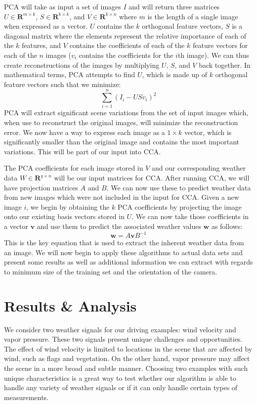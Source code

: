 PCA will take as input a set of images $I$ and will return three matrices $U\in \mathbf{R}^{m\times k}$, $S\in \mathbf{R}^{k\times k}$, and $V\in \mathbf{R}^{k\times n}$ where $m$ is the length of a single image when expressed as a vector. $U$ contains the $k$ orthogonal feature vectors, $S$ is a diagonal matrix where the elements represent the relative importance of each of the $k$ features, and $V$ contains the coefficients of each of the $k$ feature vectors for each of the $n$ images ($v_i$ contains the coefficients for the $i$th image). We can thus create reconstructions of the images by multiplying $U$, $S$, and $V$ back together. In mathematical terms, PCA attempts to find $U$, which is made up of $k$ orthogonal feature vectors such that we minimize:
\begin{equation}\sum_{i=1}^{n}{\left(I_i - USv_i\right)^2}\label{eq:pca}\end{equation}
PCA will extract significant scene variations from the set of input images which, when use to reconstruct the original images, will minimize the reconstruction error. We now have a way to express each image as a $1\times k$ vector, which is significantly smaller than the original image and contains the most important variations. This will be part of our input into CCA.

The PCA coefficients for each image stored in $V$ and our corresponding weather data $W \in \mathbf{R}^{y\times n}$ will be our input matrices for CCA. After running CCA, we will have projection matrices $A$ and $B$. We can now use these to predict weather data from new images which were not included in the input for CCA. Given a new image $i$, we begin by obtaining the $k$ PCA coefficients by projecting the image onto our existing basis vectors stored in $U$. We can now take those coefficients in a vector $\mathbf{v}$ and use them to predict the associated weather values $\mathbf{w}$ as follows:
\begin{equation}\label{eq:predict}\mathbf{w}=A\mathbf{v}B^{-1}\end{equation}
This is the key equation that is used to extract the inherent weather data from an image. We will now begin to apply these algorithms to actual data sets and present some results as well as additional information we can extract with regards to minimum size of the training set and the orientation of the camera.

\chapter{Results \& Analysis}
\label{cpt:results}
We consider two weather signals for our driving examples: wind velocity and vapor pressure. These two signals present unique challenges and opportunities. The effect of wind velocity is limited to locations in the scene that are affected by wind, such as flags and vegetation. On the other hand, vapor pressure may affect the scene in a more broad and subtle manner. Choosing two examples with such unique characteristics is a great way to test whether our algorithm is able to handle any variety of weather signals or if it can only handle certain types of measurements.

